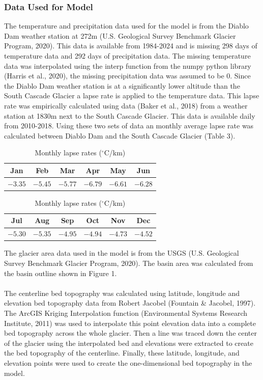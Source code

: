 \documentclass{article}
\begin{document}
\subsubsection{Data Used for Model}
The temperature and precipitation data used for the model is from the Diablo Dam weather station at 272m (U.S. Geological Survey Benchmark Glacier Program, 2020). This data is available from 1984-2024 
and is missing 298 days of temperature data and 292 days of precipitation data. The missing temperature data was interpolated 
using the interp function from the numpy python library (Harris et al., 2020), the missing precipitation data was assumed to be 0. Since the Diablo Dam
weather station is at a significantly lower altitude than the South Cascade Glacier a lapse rate is applied to the temperature data. This lapse 
rate was empirically calculated using data (Baker et al., 2018) from a weather station at 1830m next to the South Cascade Glacier. This data is available daily from 
2010-2018. Using these two sets of data an monthly average lapse rate was calculated between Diablo Dam and the South Cascade Glacier (Table 3). 
\begin{table}[h!]
    \centering
    \small
    \begin{tabular}{|*{6}{c|}}
      \hline
      Jan & Feb & Mar & Apr & May & Jun \\ 
      \hline
      $-3.35$ & $-5.45$ & $-5.77$ & $-6.79$ & $-6.61$ & $-6.28$ \\
      \hline
    \end{tabular}
    \begin{tabular}{|*{6}{c|}}
      \hline
      Jul & Aug & Sep & Oct & Nov & Dec \\ 
      \hline
      $-5.30$ & $-5.35$ & $-4.95$ & $-4.94$ & $-4.73$ & $-4.52$ \\
      \hline
    \end{tabular}
    \caption{Monthly lapse rates ($^\circ$C/km)}
    \label{tab:temp_lapse_rates}
  \end{table}
\FloatBarrier
The glacier area data used in the model is from the USGS (U.S. Geological Survey Benchmark Glacier Program, 2020). The basin area was calculated from the basin outline shown in Figure 1.
\paragraph{}
The centerline bed topography was calculated using latitude, longitude and elevation bed topography data from Robert Jacobel (Fountain \& Jacobel, 1997). 
The ArcGIS Kriging Interpolation function (Environmental Systems Research Institute, 2011) was used to interpolate this point elevation data into a complete 
bed topography across the whole glacier. Then a line was traced down the center of the glacier using the interpolated bed and elevations 
were extracted to create the bed topography of the centerline. Finally, these latitude, longitude, and elevation points were used to create 
the one-dimensional bed topography in the model.
\end{document}

